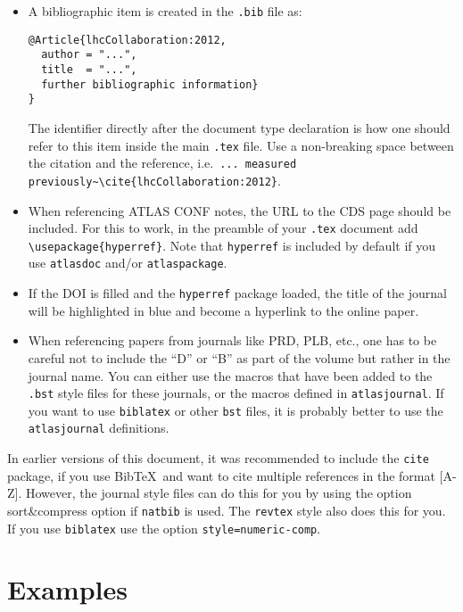 \documentclass[UKenglish]{latex/atlasdoc}
\newcommand*{\BibTeX}{Bib\TeX}
\newcommand{\File}[1]{\texttt{#1}\xspace}
\newcommand{\Option}[1]{\textsf{#1}\xspace}
\newcommand{\Package}[1]{\texttt{#1}\xspace}
\begin{document}
\begin{itemize}
\item A bibliographic item is created in the \File{.bib} file as:
\begin{verbatim}
@Article{lhcCollaboration:2012,
  author = "...",
  title  = "...",
  further bibliographic information}
}
\end{verbatim}
  The identifier directly after the document type declaration is how one should refer to this item inside the main \File{.tex} file.
  Use a non-breaking space between the citation and the reference, i.e.\
  \verb|... measured previously~\cite{lhcCollaboration:2012}|.
\item When referencing ATLAS CONF notes, the URL to the CDS page should be included.
  For this to work, in the preamble of your \File{.tex} document add
  \texttt{\textbackslash usepackage\{hyperref\}}.
  Note that \Package{hyperref} is included by default if you use \Package{atlasdoc} and/or \Package{atlaspackage}.
\item If the DOI is filled and the \texttt{hyperref} package loaded, 
  the title of the journal will be highlighted in blue and become a hyperlink to the online paper.
\item When referencing papers from journals like PRD, PLB, etc.,
  one has to be careful not to include the ``D'' or ``B'' as part of the volume but rather in the journal name. 
  You can either use the macros that have been added to the \File{.bst} style files for these journals, or
  the macros defined in \Package{atlasjournal}.
  If you want to use \Package{biblatex} or other \File{bst} files, it is probably better to use the
  \Package{atlasjournal} definitions.
\end{itemize}

In earlier versions of this document, it was recommended to include the \Package{cite} package, 
if you use \BibTeX\ and want to cite multiple references in the format [A-Z].
However, the journal style files can do this for you by using the option \Option{sort\&compress} option if \Package{natbib} is used.
The \texttt{revtex} style also does this for you.
If you use \texttt{biblatex} use the option \texttt{style=numeric-comp}.

\section{Examples}
\end{document}
